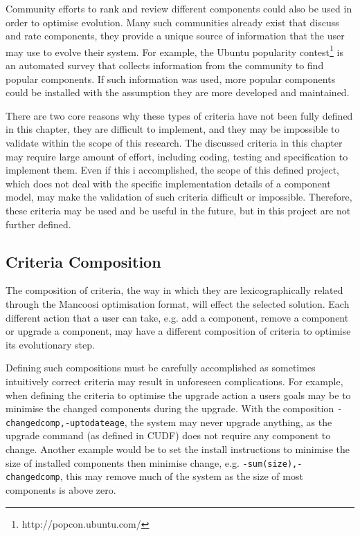 Community efforts to rank and review different components could also be used in order to optimise evolution.
Many such communities already exist that discuss and rate components, they provide a unique source of information that the user may use to evolve their system.
For example, the Ubuntu popularity contest\footnote{http://popcon.ubuntu.com/} is an automated survey that collects information from the community to find popular components.
If such information was used, more popular components could be installed with the assumption they are more developed and maintained.

There are two core reasons why these types of criteria have not been fully defined in this chapter,
they are difficult to implement, and they may be impossible to validate within the scope of this research.
The discussed criteria in this chapter may require large amount of effort, including coding, testing and specification to implement them.
Even if this i accomplished, the scope of this defined project, which does not deal with the specific implementation details of a component model,
may make the validation of such criteria difficult or impossible.
Therefore, these criteria may be used and be useful in the future, but in this project are not further defined.

\subsection{Criteria Composition}
The composition of criteria, the way in which they are lexicographically related through the Mancoosi optimisation format,
will effect the selected solution.
Each different action that a user can take, e.g. add a component, remove a component or upgrade a component, may have a different composition of criteria to optimise its evolutionary step.

Defining such compositions must be carefully accomplished as sometimes intuitively correct criteria may result in unforeseen complications.
For example, when defining the criteria to optimise the upgrade action a users goals may be to minimise the changed components during the upgrade.
With the composition \verb+-changedcomp,-uptodateage+, the system may never upgrade anything, as the upgrade command (as defined in CUDF) does not require any component to change.
Another example would be to set the install instructions to minimise the size of installed components then minimise change,
e.g. \verb!-sum(size),-changedcomp!, this may remove much of the system as the size of most components is above zero.

